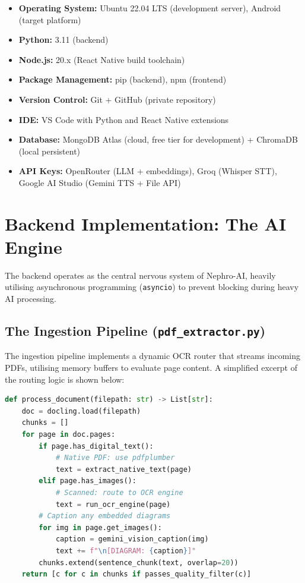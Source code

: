\documentclass[12pt,a4paper]{report}
\begin{document}
\begin{itemize}
  \item \textbf{Operating System:} Ubuntu 22.04 LTS (development server), Android (target platform)
  \item \textbf{Python:} 3.11 (backend)
  \item \textbf{Node.js:} 20.x (React Native build toolchain)
  \item \textbf{Package Management:} pip (backend), npm (frontend)
  \item \textbf{Version Control:} Git + GitHub (private repository)
  \item \textbf{IDE:} VS Code with Python and React Native extensions
  \item \textbf{Database:} MongoDB Atlas (cloud, free tier for development) + ChromaDB (local persistent)
  \item \textbf{API Keys:} OpenRouter (LLM + embeddings), Groq (Whisper STT), Google AI Studio (Gemini TTS + File API)
\end{itemize}

\section{Backend Implementation: The AI Engine}

The backend operates as the central nervous system of Nephro-AI, heavily utilising asynchronous programming (\texttt{asyncio}) to prevent blocking during heavy AI processing.

\subsection{The Ingestion Pipeline (\texttt{pdf\_extractor.py})}

The ingestion pipeline implements a dynamic OCR router that streams incoming PDFs, utilising memory buffers to evaluate page content. A simplified excerpt of the routing logic is shown below:

\begin{lstlisting}[language=Python, caption={Dynamic OCR routing logic (simplified)}, label={lst:ocr_router}]
def process_document(filepath: str) -> List[str]:
    doc = docling.load(filepath)
    chunks = []
    for page in doc.pages:
        if page.has_digital_text():
            # Native PDF: use pdfplumber
            text = extract_native_text(page)
        elif page.has_images():
            # Scanned: route to OCR engine
            text = run_ocr_engine(page)
        # Caption any embedded diagrams
        for img in page.get_images():
            caption = gemini_vision_caption(img)
            text += f"\n[DIAGRAM: {caption}]"
        chunks.extend(sentence_chunk(text, overlap=20))
    return [c for c in chunks if passes_quality_filter(c)]
\end{lstlisting}
\end{document}

